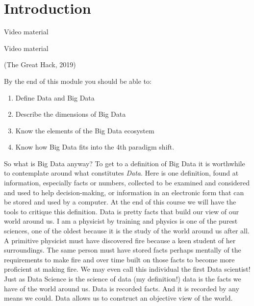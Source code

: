 
\chapter{Introduction}

Video material

Video material

(The Great Hack, 2019)

By the end of this module you should be able to:
\begin{enumerate}
	\item Define Data and Big Data
	\item Describe the dimensions of Big Data
	\item Know the elements of the Big Data ecosystem
	\item Know how Big Data fits into the 4th paradigm shift.
\end{enumerate}
So what is Big Data anyway?
To get to a definition of Big Data it is worthwhile to contemplate around what constitutes \textit{Data}.  Here is one definition, found at  \cite{Ach89}
information, especially facts or numbers, collected to be examined and considered and used to help decision-making, or information in an electronic form that can be stored and used by a computer.
At the end of this course we will have the tools to critique this definition. Data is pretty facts that build our view of our world around us.  I am a physicist by training and physics is one of the purest sciences, one of the oldest because it is the study of the world around us after all.  A primitive physicist must have discovered fire because a keen student of her surroundings.  The same person must have stored facts perhaps mentally of the requirements to make fire and over time built on those facts to become more proficient at making fire.  We may even call this individual the first Data scientist!  Just as Data Science is the science of data (my definition!) data is the facts we have of the world around us.  Data is recorded facts.  And it is recorded by any means we could.  Data allows us to construct an objective view of the world.  \par
